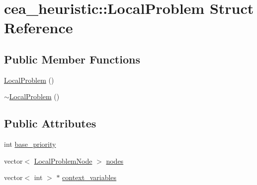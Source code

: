 \hypertarget{structcea__heuristic_1_1LocalProblem}{\section{cea\-\_\-heuristic\-:\-:Local\-Problem Struct Reference}
\label{structcea__heuristic_1_1LocalProblem}
}
\subsection*{Public Member Functions}
\begin{DoxyCompactItemize}
\item 
\hyperlink{structcea__heuristic_1_1LocalProblem_a1853d2f921adec567f49d5cab1a6e9bc}{Local\-Problem} ()
\item 
\hyperlink{structcea__heuristic_1_1LocalProblem_a63ceb60481de7ff43ea1a924e966c3e8}{$\sim$\-Local\-Problem} ()
\end{DoxyCompactItemize}
\subsection*{Public Attributes}
\begin{DoxyCompactItemize}
\item 
int \hyperlink{structcea__heuristic_1_1LocalProblem_a2a993fac180e0942b2e986cfbeb83d34}{base\-\_\-priority}
\item 
vector$<$ \hyperlink{structcea__heuristic_1_1LocalProblemNode}{Local\-Problem\-Node} $>$ \hyperlink{structcea__heuristic_1_1LocalProblem_ac2c8bf268b56b020babac230989e3025}{nodes}
\item 
vector$<$ int $>$ $\ast$ \hyperlink{structcea__heuristic_1_1LocalProblem_a377d26ddd022f172bd5fe17c84376549}{context\-\_\-variables}
\end{DoxyCompactItemize}



